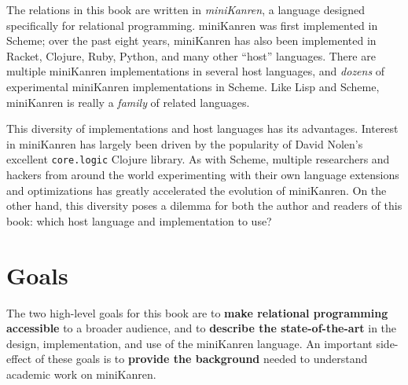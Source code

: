 The relations in this book are written in \emph{miniKanren}, a language
designed specifically for relational programming.
%
miniKanren was first implemented in Scheme; over the past eight years,
miniKanren has also been implemented in Racket,
 Clojure, Ruby, Python,
and many other ``host'' languages.
%
There are multiple miniKanren implementations in several host
languages, and \emph{dozens} of experimental miniKanren
implementations in Scheme.
%
Like Lisp and Scheme, miniKanren is really a \emph{family} of related
languages.
%

This diversity of implementations and host languages has its advantages.
%
Interest in miniKanren has largely been driven by the popularity of
David Nolen's excellent {\tt core.logic} Clojure library.
%
As with Scheme, multiple researchers and hackers from around the world
experimenting with their own language extensions and optimizations has
greatly accelerated the evolution of miniKanren.
%
On the other hand, this diversity poses a dilemma for both the author
and readers of this book: which host language and implementation to
use?








\section{Goals}\label{sec:preface:goals}


The two high-level goals for this book are to {\bf make relational programming
accessible} to a broader audience, and to {\bf describe the state-of-the-art}
in the design, implementation, and use of the miniKanren language.
%
An important side-effect of these goals is to {\bf provide the background}
needed to understand academic work on miniKanren.

